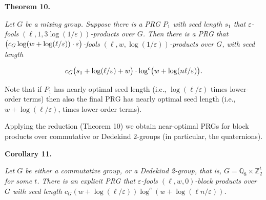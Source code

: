\documentclass[10pt,a4paper]{article}
\begin{document}


\par\medskip\noindent\textbf{
\textbf{Theorem 10}\textbf{.}
}\par



\emph{Let $G$ be a mixing group. Suppose there is
a PRG $P_{1}$ with seed length $s_{1}$ that $\varepsilon$-fools $(\ell,1,3\log(1/\varepsilon))$-products
over $G$. Then there is a PRG that $\bigl{(}c_{G}\log(w+\log(\ell/\varepsilon))\cdot\varepsilon\bigr{)}$-fools $(\ell,w,\log(1/\varepsilon))$-products
over $G$, with seed length}\par


\[\begin{gathered}
c_{G}\bigl{(}s_{1}+\log(\ell/\varepsilon)+w\bigr{)}\cdot\log^{c}\bigl{(}w+\log(n\ell/\varepsilon)\bigr{)}.
\end{gathered}\]






Note that if $P_{1}$ has nearly optimal seed length (i.e., $\log(\ell/\varepsilon)$
times lower-order terms) then also the final PRG has nearly optimal
seed length (i.e., $w+\log(\ell/\varepsilon)$, times lower-order terms).\par




Applying the reduction (Theorem 10) we obtain near-optimal
PRGs for block products over commutative or Dedekind $2$-groups (in
particular, the quaternions).\par





\par\medskip\noindent\textbf{
\textbf{Corollary 11}\textbf{.}
}\par



\emph{Let $G$ be either a commutative group, or a Dedekind
2-group, that is, $G=\mathbb{Q}_{8}\times\mathbb{Z}_{2}^{t}$ for
some $t$. There is an explicit PRG that $\varepsilon$-fools $(\ell,w,0)$-block products over $G$
with seed length $c_{G}(w+\log(\ell/\varepsilon))\log^{c}(w+\log(\ell n/\varepsilon))$.}\par



\end{document}
